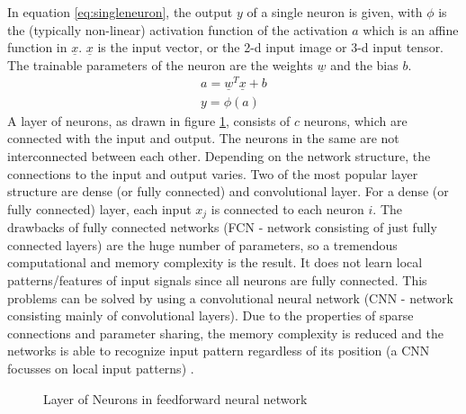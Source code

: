 \documentclass[12pt,DIV14,BCOR12mm,a4paper,footexclude,headinclude,halfparskip-,twoside,openright,openany,cleardoubleempty,idxtotoc,bibtotoc]{scrreprt} %
\numberwithin{equation}{chapter}
\begin{document}
In equation \ref{eq:singleneuron}, the output $y$ of a single neuron is given, with $\phi$ is the (typically non-linear) activation function of the activation $a$ which is an affine function in $\underline{x}$. $\underline{x}$ is the input vector, or the 2-d input image or 3-d input tensor. The trainable parameters of the neuron are the weights $\underline{w}$ and the bias $b$.
\begin{align}
	a = \underline{w}{^T}\underline{x}+b\\
	y = \phi(a) \label{eq:singleneuron}
\end{align}
A layer of neurons, as drawn in figure \ref{fig:Layer_of_neurons}, consists of $c$ neurons, which are connected with the input and output. The neurons in the same are not interconnected between each other. Depending on the network structure, the connections to the input and output varies. Two of the most popular layer structure are dense (or fully connected) and convolutional layer. For a dense (or fully connected) layer, each input $x_{j}$ is connected to each neuron $i$. The drawbacks of fully connected networks (FCN - network consisting of just fully connected layers) are the huge number of parameters, so a tremendous computational and memory complexity is the result. It does not learn local patterns/features of input signals since all neurons are fully connected. This problems can be solved by using a convolutional neural network (CNN - network consisting mainly of convolutional layers). Due to the properties of sparse connections and parameter sharing, the memory complexity is reduced and the networks is able to recognize input pattern regardless of its position (a CNN focusses on local input patterns) \cite{LectureNotes_DeepLearning}.
\begin{figure}[htb!]
	\centering
	\qquad
	\caption{Layer of Neurons in feedforward neural network}
	\label{fig:Layer_of_neurons}
\end{figure}
\end{document}
